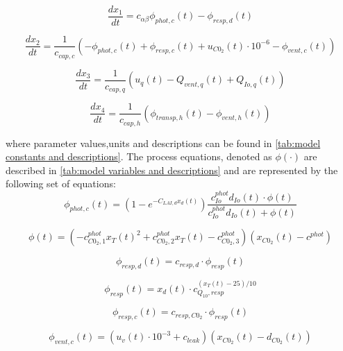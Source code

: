 \begin{equation}
	\frac{dx_1}{dt} = c_{\alpha \beta} \phi_{phot,c}(t) - \phi_{resp,d}(t)
\end{equation}

\begin{equation}
	\frac{dx_{2}}{dt} = \frac{1}{c_{cap,c}}(-\phi_{phot,c}(t) + \phi_{resp,c}(t) + u_{C0_2}(t) \cdot 10^{-6} - \phi_{vent,c}(t))
\end{equation}

\begin{equation}
	\frac{dx_{3}}{dt} = \frac{1}{c_{cap,q}}(u_{q}(t) - Q_{vent,q}(t) + Q_{Io,q}(t))
\end{equation}

\begin{equation}
	\frac{dx_{4}}{dt} = \frac{1}{c_{cap,h}}(\phi_{transp,h}(t) - \phi_{vent,h}(t))
\end{equation}

where parameter values,units and descriptions can be found in \autoref{tab:model constants and descriptions}. The process equations, denoted as $\phi(\cdot)$ are described in \autoref{tab:model variables and descriptions} and are represented by the following set of equations:
\begin{equation}
	\phi_{phot,c}(t) = (1 - e^{-C_{LAI,d} x_d(t)}) \frac{c_{Io}^{phot} d_{Io}(t) \cdot \phi(t)}{c_{Io}^{phot} d_{Io}(t) +\phi(t)}
	\label{eq: canopy photosynthesis rate}
\end{equation}

\begin{equation}
	\phi (t) = ( -c_{C0_2,1}^{phot} x_T(t)^2 +  c_{C0_2,2}^{phot} x_T(t) - c_{C0_2,3}^{phot} )( x_{C0_2}(t) - c^{phot})
	\label{eq: model phi}
\end{equation}

\begin{equation}
	\phi_{resp,d}(t) = c_{resp,d} \cdot \phi_{resp}(t)
	\label{eq:maintenance respiration rate}
\end{equation}

\begin{equation}
	\phi_{resp}(t) = x_d(t) \cdot c_{Q_{10},resp}^{(x_T(t)-25)/10}
	\label{ respiration maintenance}
\end{equation}

\begin{equation}
	\phi_{resp,c}(t) = c_{resp,C0_2} \cdot \phi_{resp}(t)
	\label{ co2 respiration rate}
\end{equation}

\begin{equation}
	\phi_{vent,c}(t) = (u_v(t) \cdot 10^{-3} + c_{leak})(x_{C0_2}(t) - d_{C0_2}(t))
	\label{eq:co2 exchange}
\end{equation}


